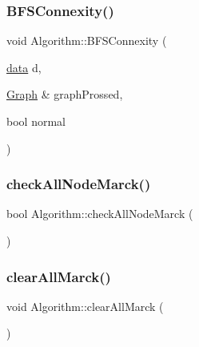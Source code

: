 \mbox{\label{struct_algorithm_ab6992a48b0de3c2a9cdc638761e9e531}} 
\subsubsection{\texorpdfstring{B\+F\+S\+Connexity()}{BFSConnexity()}}
{\footnotesize\ttfamily void Algorithm\+::\+B\+F\+S\+Connexity (\begin{DoxyParamCaption}\item[{\mbox{\hyperlink{_graph_8h_a98cbe1f79429fc62806b32b6e8871d9e}{data}}}]{d,  }\item[{\mbox{\hyperlink{class_graph}{Graph}} \&}]{graph\+Prossed,  }\item[{bool}]{normal }\end{DoxyParamCaption})}

\mbox{\label{struct_algorithm_aee02f753076dd71f76d029249c2e1e22}} 
\subsubsection{\texorpdfstring{check\+All\+Node\+Marck()}{checkAllNodeMarck()}}
{\footnotesize\ttfamily bool Algorithm\+::check\+All\+Node\+Marck (\begin{DoxyParamCaption}{ }\end{DoxyParamCaption})}

\mbox{\label{struct_algorithm_a86fac96d365d99c0a210f060a1daa67c}} 
\subsubsection{\texorpdfstring{clear\+All\+Marck()}{clearAllMarck()}\hspace{0.1cm}{\footnotesize\ttfamily [1/2]}}
{\footnotesize\ttfamily void Algorithm\+::clear\+All\+Marck (\begin{DoxyParamCaption}{ }\end{DoxyParamCaption})}

